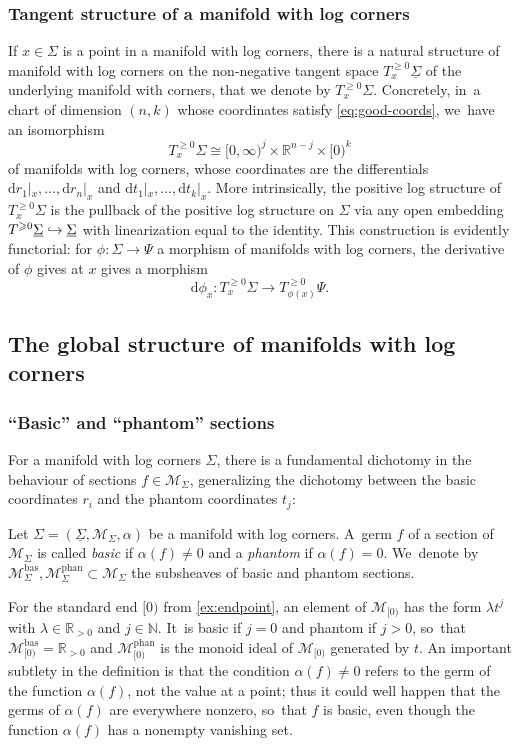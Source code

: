 \documentclass[10pt]{amsart}
\newcommand\hto{\mathrel{\lhook\joinrel\to}}
\theoremstyle{definition}
\theoremstyle{remark}
\newenvironment{example}
  {\pushQED{\qed}\renewcommand{\qedsymbol}{$\lozenge$}\examplex}
  {\popQED\endexamplex}
\let\defn\emph
\newcommand{\RR}{\mathbb{R}}
\newcommand{\NN}{\mathbb{N}}
\renewcommand{\ge}{\geqslant}
\newcommand{\cM}{\mathscr{M}}
\newcommand{\cMbas}{\mathscr{M}^{\mathrm{bas}}}
\newcommand{\cMphan}{\mathscr{M}^{\mathrm{phan}}}
\newcommand{\dd}{\mathrm{d}}
\newcommand{\Sig}{\Sigma}
\newcommand{\uSig}{\underline{\Sigma}}
\newcommand{\tbge}[2][]{T^{\ge0}_{#1}#2}
\let\Subsection\subsection\let\Subsubsection\subsubsection
\begin{document}
\subsubsection{Tangent structure of a manifold with log corners}\label{sec:tangent-log-corners}
If $x\in \Sig$ is a point in a manifold with log corners, there is a natural structure of manifold with log corners on the non-negative tangent space $\tbge[x]{\uSig}$ of the underlying manifold with corners, that we denote by $\tbge[x]{\Sig}$. Concretely, in~a chart of dimension $(n,k)$ whose coordinates satisfy \eqref{eq:good-coords}, we~have an isomorphism
\[
\tbge[x]{\Sig} \cong [0,\infty)^j\times \RR^{n-j}\times [0)^k
\]
of manifolds with log corners, whose coordinates are the differentials $\dd r_1|_x,\ldots,\dd r_n|_x$ and $\dd t_1|_x,\ldots,\dd t_k|_x$. More intrinsically, the positive log structure of $\tbge[x]{\Sig}$ is the pullback of the positive log structure on $\Sig$ via any open embedding $\tbge{\uSig} \hto \uSig$ with linearization equal to the identity. This construction is evidently functorial: for $\phi\colon \Sig\to \Psi$ a morphism of manifolds with log corners, the derivative of $\phi$ gives at $x$ gives a morphism
\[
\dd \phi_x\colon T_x^{\ge 0}\Sig \to T_{\phi(x)}^{\ge 0}\Psi.
\]

\Subsection{The global structure of manifolds with log corners}

\subsubsection{``Basic'' and ``phantom'' sections}

For a manifold with log corners $\Sig$, there is a fundamental dichotomy in the behaviour of sections $f \in \cM_{\Sig}$, generalizing the dichotomy between the basic coordinates $r_i$ and the phantom coordinates $t_j$:

\begin{definition}
Let $\Sig=(\uSig,\cM_\Sig,\alpha)$ be a manifold with log corners. A~germ $f$ of a section of $\cM_\Sig$ is called \defn{basic} if $\alpha(f)\neq 0$ and a \defn{phantom} if $\alpha(f)=0$. We~denote by $\cMbas_\Sig,\cMphan_\Sig \subset \cM_\Sig$ the subsheaves of basic and phantom sections.
\end{definition}

\begin{example}
For the standard end $[0)$ from \autoref{ex:endpoint}, an element of $\cM_{[0)}$ has the form $\lambda t^j$ with $\lambda\in\RR_{>0}$ and $j\in\NN$. It~is basic if $j=0$ and phantom if $j>0$, so~that $\cMbas_{[0)}=\RR_{>0}$ and $\cMphan_{[0)}$ is the monoid ideal of $\cM_{[0)}$ generated by $t$.
\end{example}
An important subtlety in the definition is that the condition $\alpha(f) \neq 0$ refers to the germ of the function $\alpha(f)$, not the value at a point; thus it could well happen that the germs of $\alpha(f)$ are everywhere nonzero, so~that $f$ is basic, even though the function $\alpha(f)$ has a nonempty vanishing set.
\end{document}
